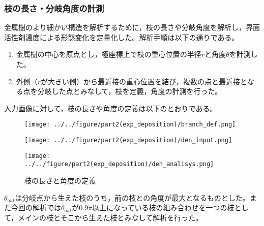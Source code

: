 \documentclass[autodetect-engine,dvi=dvipdfmx,a4paper,ja=standard,oneside,openany,11pt,draft]{bxjsarticle}
\begin{document}
\subsubsection{枝の長さ・分岐角度の計測}
金属樹のより細かい構造を解析するために，枝の長さや分岐角度を解析し，界面活性剤濃度による形態変化を定量化した。解析手順は以下の通りである。
\begin{enumerate}
  \item 金属樹の中心を原点とし，極座標上で枝の重心位置の半径$r$と角度$\theta$を計測した。
  \item 外側（$r$が大きい側）から最近接の重心位置を結び，複数の点と最近接となる点を分岐した点とみなして，枝を定義，角度の計測を行った。
\end{enumerate}
入力画像に対して，枝の長さや角度の定義は以下のとおりである。
\begin{figure}
  \begin{minipage}
    {0.32\textwidth}
    \centering
    \texttt{[image: ../../figure/part2(exp\_deposition)/branch\_def.png]}
    \label{fig:branch_def}
  \end{minipage}
  \begin{minipage}
    {0.32\textwidth}
    \centering
    \texttt{[image: ../../figure/part2(exp\_deposition)/den\_input.png]}
    \label{fig:den_input}
  \end{minipage}
  \begin{minipage}
    {0.32\textwidth}
    \centering
    \texttt{[image: ../../figure/part2(exp\_deposition)/den\_analisys.png]}
    \label{fig:den_analisys}
  \end{minipage}
  \caption{枝の長さと角度の定義}
\end{figure}
$\theta_{out}$は分岐点から生えた枝のうち，前の枝との角度が最大となるものとした。また今回の解析では$\theta_{out}$が$0.9\pi$以上になっている枝の組み合わせを一つの枝として，メインの枝とそこから生えた枝とみなして解析を行った。
\end{document}
